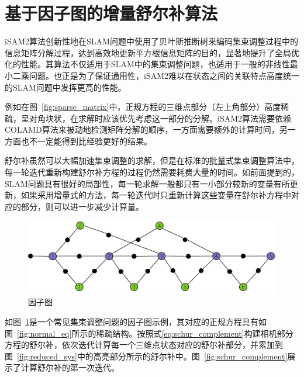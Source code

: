 \section{基于因子图的增量舒尔补算法}\label{sec:ischur}

iSAM2算法\citep{kaess2008isam,kaess2012isam2}创新性地在SLAM问题中使用了贝叶斯推断树来编码集束调整过程中的信息矩阵分解过程，达到高效地更新平方根信息矩阵的目的，显著地提升了全局优化的性能。其算法不仅适用于SLAM中的集束调整问题，也适用于一般的非线性最小二乘问题。也正是为了保证通用性，iSAM2难以在状态之间的关联特点高度统一的SLAM问题中发挥更高的性能。

例如在图~\ref{fig:sparse_matrix}中，正规方程的三维点部分（左上角部分）高度稀疏，呈对角块状，在求解时应该优先考虑这一部分的分解。iSAM2算法需要依赖COLAMD\citep{davis2004algorithm}算法来被动地检测矩阵分解的顺序，一方面需要额外的计算时间，另一方面也不一定能得到比经验更好的结果。

舒尔补虽然可以大幅加速集束调整的求解，但是在标准的批量式集束调整算法中，每一轮迭代重新构建舒尔补方程的过程仍然需要耗费大量的时间。如前面提到的，SLAM问题具有很好的局部性，每一轮求解一般都只有一小部分较新的变量有所更新，如果采用增量式的方法，每一轮迭代时只重新计算这些变量在舒尔补方程中对应的部分，则可以进一步减少计算量。

\begin{figure}[htb!]
    \centering
    \includegraphics[scale=.7]{Pictures/factor_graph.png}
    \caption{因子图}
    \label{fig:factor_graph}
\end{figure}

如图~\ref{fig:factor_graph}是一个常见集束调整问题的因子图示例，其对应的正规方程具有如图~\ref{fig:normal_eq}所示的稀疏结构。按照式\eqref{eq:schur_complement}构建相机部分方程的舒尔补，依次迭代计算每一个三维点状态对应的舒尔补部分，并累加到图~\ref{fig:reduced_sys}中的高亮部分所示的舒尔补中。图~\ref{fig:schur_complement}展示了计算舒尔补的第一次迭代。

